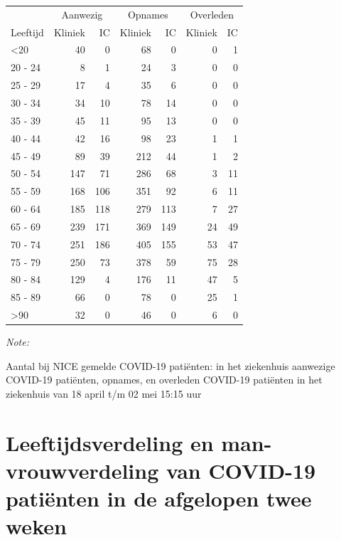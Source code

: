 \documentclass[
  english,
  man,floatsintext]{apa6}
\begin{document}
\begin{table}
\centering\begingroup\fontsize{10}{12}\selectfont

\begin{threeparttable}
\begin{tabular}{lrrrrrr}
\toprule
\multicolumn{1}{c}{ } & \multicolumn{2}{c}{Aanwezig} & \multicolumn{2}{c}{Opnames} & \multicolumn{2}{c}{Overleden} \\
\cmidrule(l{3pt}r{3pt}){2-3} \cmidrule(l{3pt}r{3pt}){4-5} \cmidrule(l{3pt}r{3pt}){6-7}
Leeftijd & Kliniek & IC & Kliniek & IC & Kliniek & IC\\
\midrule
<20 & 40 & 0 & 68 & 0 & 0 & 1\\
20 - 24 & 8 & 1 & 24 & 3 & 0 & 0\\
25 - 29 & 17 & 4 & 35 & 6 & 0 & 0\\
30 - 34 & 34 & 10 & 78 & 14 & 0 & 0\\
35 - 39 & 45 & 11 & 95 & 13 & 0 & 0\\
40 - 44 & 42 & 16 & 98 & 23 & 1 & 1\\
45 - 49 & 89 & 39 & 212 & 44 & 1 & 2\\
50 - 54 & 147 & 71 & 286 & 68 & 3 & 11\\
55 - 59 & 168 & 106 & 351 & 92 & 6 & 11\\
60 - 64 & 185 & 118 & 279 & 113 & 7 & 27\\
65 - 69 & 239 & 171 & 369 & 149 & 24 & 49\\
70 - 74 & 251 & 186 & 405 & 155 & 53 & 47\\
75 - 79 & 250 & 73 & 378 & 59 & 75 & 28\\
80 - 84 & 129 & 4 & 176 & 11 & 47 & 5\\
85 - 89 & 66 & 0 & 78 & 0 & 25 & 1\\
>90 & 32 & 0 & 46 & 0 & 6 & 0\\
\bottomrule
\end{tabular}
\begin{tablenotes}
\item \textit{Note: } 
\item Aantal bij NICE gemelde COVID-19 patiënten: in het ziekenhuis aanwezige COVID-19 patiënten, opnames, en overleden COVID-19 patiënten in het ziekenhuis van 18 april t/m 02 mei 15:15 uur
\end{tablenotes}
\end{threeparttable}
\endgroup{}
\end{table}

\newpage

\hypertarget{leeftijdsverdeling-en-man-vrouwverdeling-van-covid-19-patiuxebnten-in-de-afgelopen-twee-weken}{%
\section{Leeftijdsverdeling en man-vrouwverdeling van COVID-19 patiënten in de afgelopen twee weken}\label{leeftijdsverdeling-en-man-vrouwverdeling-van-covid-19-patiuxebnten-in-de-afgelopen-twee-weken}}
\end{document}
